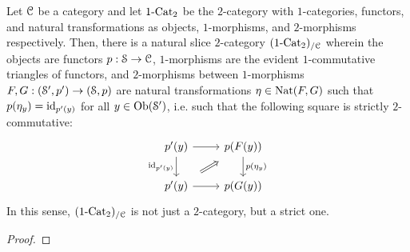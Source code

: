             \begin{example} \label{example: over_categories}
                Let $\C$ be a category and let $1\-\Cat_2$ be the $2$-category with $1$-categories, functors, and natural transformations as objects, $1$-morphisms, and $2$-morphisms respectively. Then, there is a natural slice $2$-category $(1\-\Cat_2)_{/\C}$ wherein the objects are functors $p: \S \to \C$, $1$-morphisms are the evident $1$-commutative triangles of functors, and $2$-morphisms between $1$-morphisms $F, G: (\S', p') \to (\S, p)$ are natural transformations $\eta \in \Nat(F, G)$ such that $p(\eta_y) = \id_{p'(y)}$ for all $y \in \Ob(\S')$, i.e. such that the following square is strictly $2$-commutative:
                    $$
                        \begin{tikzcd}
                        	{p'(y)} & {p(F(y))} \\
                        	{p'(y)} & {p(G(y))}
                        	\arrow["{p(\eta_y)}", from=1-2, to=2-2]
                        	\arrow[from=1-1, to=1-2]
                        	\arrow["{\id_{p'(y)}}"', from=1-1, to=2-1]
                        	\arrow[from=2-1, to=2-2]
                        	\arrow[shorten <=8pt, shorten >=8pt, Rightarrow, from=2-1, to=1-2]
                        \end{tikzcd}
                    $$
                In this sense, $(1\-\Cat_2)_{/\C}$ is not just a $2$-category, but a strict one.
            \end{example}
            \begin{proposition} \label{prop: 2_pullbacks_in_slice_2_categories}
                
            \end{proposition}
                \begin{proof}
                            
                \end{proof}
            
